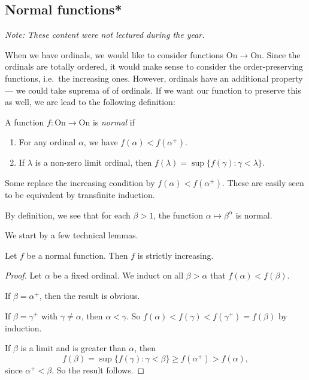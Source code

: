 \documentclass[a4paper]{article}
\begin{document}
\subsection{Normal functions*}
\begin{own}
  \emph{Note: These content were not lectured during the year.}

  When we have ordinals, we would like to consider functions $\mathrm{On} \to \mathrm{On}$. Since the ordinals are totally ordered, it would make sense to consider the order-preserving functions, i.e.\ the increasing ones. However, ordinals have an additional property --- we could take suprema of of ordinals. If we want our function to preserve this as well, we are lead to the following definition:

  \begin{defi}
    A function $f: \mathrm{On} \to \mathrm{On}$ is \emph{normal} if
    \begin{enumerate}
      \item For any ordinal $\alpha$, we have $f(\alpha) < f(\alpha^+)$.
      \item If $\lambda$ is a non-zero limit ordinal, then $f(\lambda) = \sup \{f(\gamma): \gamma < \lambda\}$.
    \end{enumerate}
  \end{defi}
  Some replace the increasing condition by $f(\alpha) < f(\alpha^+)$. These are easily seen to be equivalent by transfinite induction.

  \begin{eg}
    By definition, we see that for each $\beta > 1$, the function $\alpha \mapsto \beta^\alpha$ is normal.
  \end{eg}

  We start by a few technical lemmas.
  \begin{lemma}
    Let $f$ be a normal function. Then $f$ is strictly increasing.
  \end{lemma}

  \begin{proof}
    Let $\alpha$ be a fixed ordinal. We induct on all $\beta > \alpha$ that $f(\alpha) < f(\beta)$.

    If $\beta = \alpha^+$, then the result is obvious.

    If $\beta = \gamma^+$ with $\gamma \not= \alpha$, then $\alpha < \gamma$. So $f(\alpha) < f(\gamma) < f(\gamma^+) = f(\beta)$ by induction.

    If $\beta$ is a limit and is greater than $\alpha$, then
    \[
      f(\beta) = \sup\{f(\gamma): \gamma < \beta\} \geq f(\alpha^+) > f(\alpha),
    \]
    since $\alpha^+ < \beta$. So the result follows.
  \end{proof}


\end{own}
\end{document}
